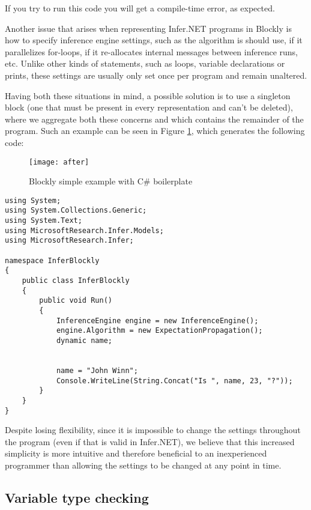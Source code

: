 If you try to run this code you will get a compile-time error, as expected.

Another issue that arises when representing Infer.NET programs in Blockly is how
to specify inference engine settings, such as the algorithm is should use, if it
parallelizes for-loops, if it re-allocates internal messages between inference
runs, etc. Unlike other kinds of statements, such as loops, variable declarations
or prints, these settings are usually only set once per program and remain
unaltered.

Having both these situations in mind, a possible solution is to use a singleton
block (one that must be present in every representation and can't be deleted),
where we aggregate both these concerns and which contains the remainder of the program.
Such an example can be seen in Figure \ref{fig:after}, which generates the following code:

\begin{figure}[!htpb]
  \begin{center}
    \leavevmode
    \texttt{[image: after]}
    \caption{Blockly simple example with C# boilerplate}
    \label{fig:after}
  \end{center}
\end{figure}

\begin{lstlisting}
using System;
using System.Collections.Generic;
using System.Text;
using MicrosoftResearch.Infer.Models;
using MicrosoftResearch.Infer;

namespace InferBlockly
{
	public class InferBlockly
	{
		public void Run()
		{
			InferenceEngine engine = new InferenceEngine();
			engine.Algorithm = new ExpectationPropagation();
			dynamic name;


			name = "John Winn";
			Console.WriteLine(String.Concat("Is ", name, 23, "?"));
		}
	}
}
\end{lstlisting}

Despite losing flexibility, since it is impossible to change the settings
throughout the program (even if that is valid in Infer.NET),
we believe that this increased simplicity is more intuitive and therefore beneficial to an inexperienced
programmer than allowing the settings to be changed at any point in time.

\subsection{Variable type checking}

